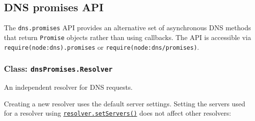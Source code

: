\subsection{DNS promises API}\label{dns-promises-api}

The \texttt{dns.promises} API provides an alternative set of
asynchronous DNS methods that return \texttt{Promise} objects rather
than using callbacks. The API is accessible via
\texttt{require(\textquotesingle{}node:dns\textquotesingle{}).promises}
or
\texttt{require(\textquotesingle{}node:dns/promises\textquotesingle{})}.

\subsubsection{\texorpdfstring{Class:
\texttt{dnsPromises.Resolver}}{Class: dnsPromises.Resolver}}\label{class-dnspromises.resolver}

An independent resolver for DNS requests.

Creating a new resolver uses the default server settings. Setting the
servers used for a resolver using
\hyperref[dnspromisessetserversservers]{\texttt{resolver.setServers()}}
does not affect other resolvers:

\begin{Shaded}
\begin{Highlighting}[]
\OperatorTok{=} \NormalTok{(}\NormalTok{)}\OperatorTok{;}
\OperatorTok{=}  \NormalTok{()}\OperatorTok{;}
\NormalTok{([}\NormalTok{])}\OperatorTok{;}

\NormalTok{(}\NormalTok{)}\KeywordTok{=\textgreater{}}\NormalTok{ \{}
\NormalTok{\})}\OperatorTok{;}

\NormalTok{(} \NormalTok{() \{}
  \OperatorTok{=} \NormalTok{(}\NormalTok{)}\OperatorTok{;}
\NormalTok{\})()}\OperatorTok{;}
\end{Highlighting}
\end{Shaded}

